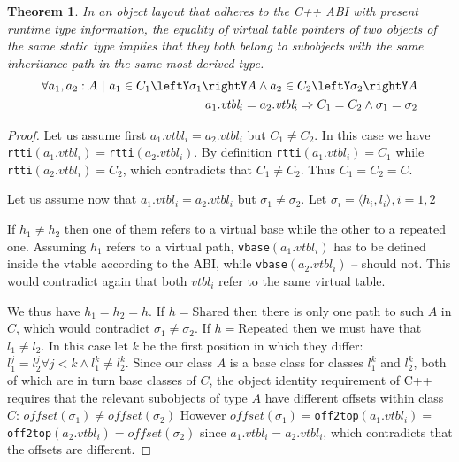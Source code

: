 \documentclass[preprint]{sigplanconf}
\makeatletter
\DeclareRobustCommand{\code}[1]{{\lstinline[breaklines=false,escapechar=@]{#1}}}
\newtheorem{theorem}{Theorem}
\makeatother
\begin{document}
\begin{theorem}
In an object layout that adheres to the C++ ABI with present runtime type 
information, the equality of virtual table pointers of two objects of the same 
static type implies that they both belong to subobjects with the same 
inheritance path in the same most-derived type.
\begin{eqnarray*}
    \forall a_1, a_2 : A\ |\ a_1\in C_1\leftY\sigma_1\rightY A \wedge a_2\in C_2\leftY\sigma_2\rightY A \\
    a_1.\textit{vtbl}_i = a_2.\textit{vtbl}_i \Rightarrow C_1 = C_2 \wedge \sigma_1 = \sigma_2
\end{eqnarray*}
\label{thm:vtbl}
\end{theorem}
\begin{proof}
Let us assume first $a_1.\textit{vtbl}_i = a_2.\textit{vtbl}_i$ but $C_1 \neq C_2$. In this case we 
have \code{rtti}$(a_1.\textit{vtbl}_i) = $\code{rtti}$(a_2.\textit{vtbl}_i)$. By definition 
\code{rtti}$(a_1.\textit{vtbl}_i) = C_1$ while \code{rtti}$(a_2.\textit{vtbl}_i) = C_2$, which 
contradicts that $C_1 \neq C_2$. Thus $C_1 = C_2 = C$.

Let us assume now that $a_1.\textit{vtbl}_i = a_2.\textit{vtbl}_i$ but $\sigma_1 \neq \sigma_2$. 
Let $\sigma_i=\langle h_i,l_i\rangle,i=1,2$ 

If $h_1 \neq h_2$ then one of them refers to a virtual base while the other to a 
repeated one. Assuming $h_1$ refers to a virtual path, \code{vbase}$(a_1.\textit{vtbl}_i)$ 
has to be defined inside the vtable according to the ABI, while 
\code{vbase}$(a_2.\textit{vtbl}_i)$ -- should not. This would contradict again that both 
$vtbl_i$ refer to the same virtual table.

We thus have $h_1 = h_2 = h$. If $h = \mathrm{Shared}$ then there is only one path to 
such $A$ in $C$, which would contradict $\sigma_1 \neq \sigma_2$. 
If $h = \mathrm{Repeated}$ then we must have that $l_1 \neq l_2$. In this case let $k$ be 
the first position in which they differ: 
$l_1^j=l_2^j \forall j<k \wedge l_1^k\neq l_2^k$. Since our class $A$ is a base 
class for classes $l_1^k$ and $l_2^k$, both of which are in turn base classes of 
$C$, the object identity requirement of C++ requires that the relevant subobjects 
of type $A$ have different offsets within class $C$: 
$\mathit{offset}(\sigma_1)\neq \mathit{offset}(\sigma_2)$ However 
$\mathit{offset}(\sigma_1)=$\code{off2top}$(a_1.\textit{vtbl}_i)=$\code{off2top}$(a_2.\textit{vtbl}_i)=\mathit{offset}(\sigma_2)$ 
since $a_1.\textit{vtbl}_i = a_2.\textit{vtbl}_i$, which contradicts that the offsets are different.
\end{proof}
\end{document}
